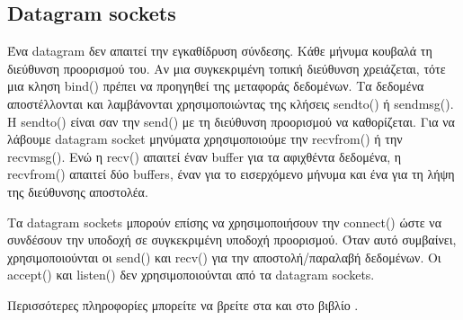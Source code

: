 \subsection*{Datagram sockets}
Ένα datagram δεν απαιτεί την εγκαθίδρυση σύνδεσης. Κάθε μήνυμα κουβαλά τη διεύθυνση προορισμού του. Αν μια συγκεκριμένη τοπική διεύθυνση
χρειάζεται, τότε μια κληση bind() πρέπει να προηγηθεί της μεταφοράς δεδομένων. Τα δεδομένα αποστέλλονται και λαμβάνονται χρησιμοποιώντας της
κλήσεις sendto() ή sendmsg(). Η sendto() είναι σαν την send() με τη διεύθυνση προορισμού να καθορίζεται. Για να λάβουμε datagram socket
μηνύματα χρησιμοποιούμε την recvfrom() ή την recvmsg(). Ενώ η recv() απαιτεί έναν buffer για τα αφιχθέντα δεδομένα, η recvfrom() απαιτεί δύο
buffers, έναν για το εισερχόμενο μήνυμα και ένα για τη λήψη της διεύθυνσης αποστολέα. 

Τα datagram sockets μπορούν επίσης να χρησιμοποιήσουν την connect() ώστε να συνδέσουν την υποδοχή σε συγκεκριμένη υποδοχή προορισμού. Όταν
αυτό συμβαίνει, χρησιμοποιούνται οι send() και recv() για την αποστολή/παραλαβή δεδομένων. Οι accept() και listen() δεν χρησιμοποιούνται
από τα datagram sockets.





%





%


Περισσότερες πληροφορίες μπορείτε να βρείτε στα \cite{NetSockets,UnixSockets, SocketsTutorial, Beej, Endianness, OutOfBound, SocketsIntro, TCPConTerm, SockAddrStruct, ReadSock, Sockets} και στο βιβλίο \cite{stevens2004unix}.


